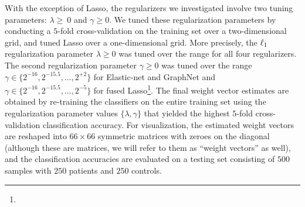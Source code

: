 With the exception of Lasso, the regularizers we investigated involve two tuning parameters: $\lambda\geq~0$ and $\gamma\geq 0$.
We tuned these regularization parameters by conducting a \mbox{$5$-fold} cross-validation on the training set over a two-dimensional grid, and tuned Lasso over a one-dimensional grid.
More precisely, the $\ell_1$ regularization parameter $\lambda\geq 0$ was tuned over the range  for all four regularizers.
The second regularization parameter $\gamma\geq 0$ was tuned over the range $\gamma\in\{2^{-16},2^{-15.5},\dots,2^{+2}\}$ for Elastic-net and GraphNet and $\gamma\in\{2^{-16},2^{-15.5},\dots,2^{-5}\}$ for fused Lasso\footnote{\FOOTMESSAGE}.
The final weight vector estimates are obtained by re-training the classifiers on the entire training set using the regularization parameter values $\{\lambda,\gamma\}$ that yielded the highest $5$-fold cross-validation classification accuracy.
For visualization, the estimated weight vectors are reshaped into $66\times 66$ symmetric matrices with zeroes on the diagonal (although these are matrices, we will refer to them as ``weight vectors'' as well), and the classification accuracies are evaluated on a testing set consisting of $500$ samples with $250$ patients and $250$ controls.

